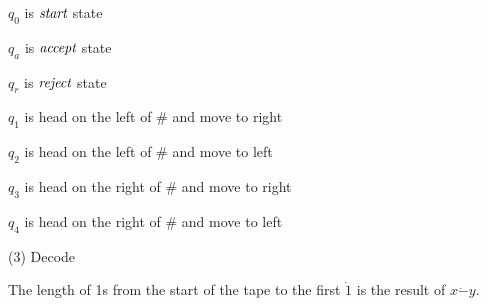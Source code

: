 \documentclass{article}
\begin{document}
\vspace{5mm} 

\hspace{0.5cm}$q_0$ is $\emph{start}$ state

\hspace{0.5cm}$q_a$ is $\emph{accept}$ state

\hspace{0.5cm}$q_r$ is $\emph{reject}$ state

\hspace{0.5cm}$q_1$ is head on the left of \# and move to right

\hspace{0.5cm}$q_2$ is head on the left of \# and move to left

\hspace{0.5cm}$q_3$ is head on the right of \# and move to right

\hspace{0.5cm}$q_4$ is head on the right of \# and move to left

\vspace{5mm}

(3) Decode 

\hspace{0.5cm}The length of 1s from the start of the tape to the first $\dot{1}$ is the result of $x \dot{-} y$.
 
\vspace{5mm}
\end{document}
